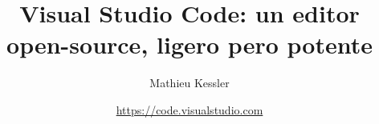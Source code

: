 \documentclass[9pt]{beamer}
\begin{document}
\title{Visual Studio Code: un editor open-source, ligero pero potente}

\author[Mathieu Kessler]{Mathieu Kessler}
\date{\href{https://code.visualstudio.com}{https://code.visualstudio.com}}

\begin{frame}
  \titlepage
\end{frame}
\end{document}

